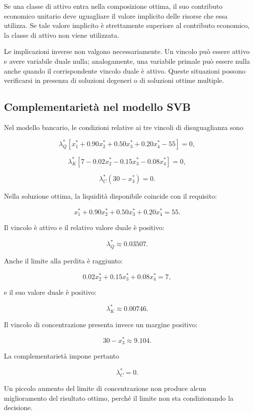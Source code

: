 Se una classe di attivo entra nella composizione ottima, il suo contributo
economico unitario deve uguagliare il valore implicito delle risorse che essa
utilizza. Se tale valore implicito \`e strettamente superiore al contributo
economico, la classe di attivo non viene utilizzata.

Le implicazioni inverse non valgono necessariamente. Un vincolo pu\`o essere
attivo e avere variabile duale nulla; analogamente, una variabile primale pu\`o
essere nulla anche quando il corrispondente vincolo duale \`e attivo. Queste
situazioni possono verificarsi in presenza di soluzioni degeneri o di
soluzioni ottime multiple.

\subsection{Complementariet\`a nel modello SVB}

Nel modello bancario, le condizioni relative ai tre vincoli di
disuguaglianza sono

\[
\lambda_Q^*
\left[
x_1^*
+
0.90x_2^*
+
0.50x_3^*
+
0.20x_4^*
-
55
\right]
=
0,
\]

\[
\lambda_K^*
\left[
7
-
0.02x_2^*
-
0.15x_3^*
-
0.08x_4^*
\right]
=
0,
\]

\[
\lambda_C^*
\left(
30-x_3^*
\right)
=
0.
\]

Nella soluzione ottima, la liquidit\`a disponibile coincide con il requisito:

\[
x_1^*
+
0.90x_2^*
+
0.50x_3^*
+
0.20x_4^*
=
55.
\]

Il vincolo \`e attivo e il relativo valore duale \`e positivo:

\[
\lambda_Q^*
\approx
0.03507.
\]

Anche il limite alla perdita \`e raggiunto:

\[
0.02x_2^*
+
0.15x_3^*
+
0.08x_4^*
=
7,
\]

\noindent e il suo valore duale \`e positivo:

\[
\lambda_K^*
\approx
0.00746.
\]

Il vincolo di concentrazione presenta invece un margine positivo:

\[
30-x_3^*
\approx
9.104.
\]

La complementariet\`a impone pertanto

\[
\lambda_C^*=0.
\]

Un piccolo aumento del limite di concentrazione non produce alcun
miglioramento del risultato ottimo, perch\'e il limite non sta condizionando
la decisione.

